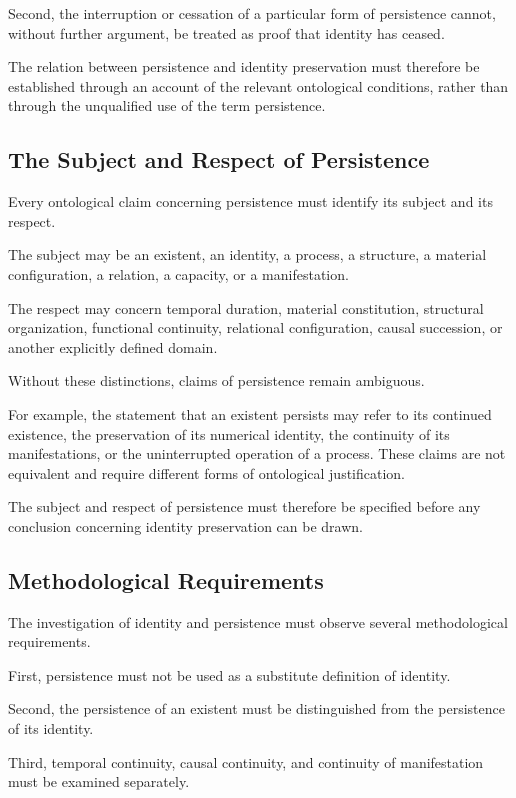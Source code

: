 Second, the interruption or cessation of a particular
form of persistence cannot, without further argument,
be treated as proof that identity has ceased.

The relation between persistence and identity preservation
must therefore be established through an account of
the relevant ontological conditions, rather than through
the unqualified use of the term persistence.

\subsection{The Subject and Respect of Persistence}

Every ontological claim concerning persistence must
identify its subject and its respect.

The subject may be an existent, an identity, a process,
a structure, a material configuration, a relation,
a capacity, or a manifestation.

The respect may concern temporal duration, material
constitution, structural organization, functional
continuity, relational configuration, causal succession,
or another explicitly defined domain.

Without these distinctions, claims of persistence
remain ambiguous.

For example, the statement that an existent persists
may refer to its continued existence, the preservation
of its numerical identity, the continuity of its
manifestations, or the uninterrupted operation of
a process. These claims are not equivalent and require
different forms of ontological justification.

The subject and respect of persistence must therefore
be specified before any conclusion concerning identity
preservation can be drawn.

\subsection{Methodological Requirements}

The investigation of identity and persistence must
observe several methodological requirements.

First, persistence must not be used as a substitute
definition of identity.

Second, the persistence of an existent must be distinguished
from the persistence of its identity.

Third, temporal continuity, causal continuity, and
continuity of manifestation must be examined separately.

